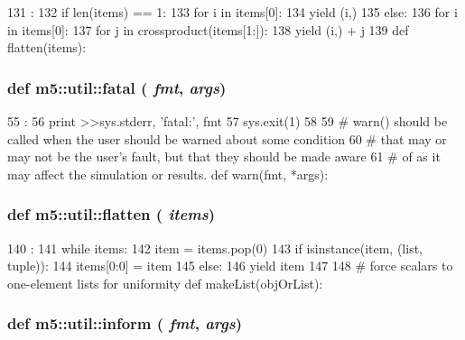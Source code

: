 \begin{DoxyCode}
131                        :
132     if len(items) == 1:
133         for i in items[0]:
134             yield (i,)
135     else:
136         for i in items[0]:
137             for j in crossproduct(items[1:]):
138                 yield (i,) + j
139 
def flatten(items):
\end{DoxyCode}
\hypertarget{namespacem5_1_1util_ae1c80955a028fc0aec505dbd4fa9e09c}{
\subsubsection[{fatal}]{\setlength{\rightskip}{0pt plus 5cm}def m5::util::fatal ( {\em fmt}, \/   {\em args})}}
\label{namespacem5_1_1util_ae1c80955a028fc0aec505dbd4fa9e09c}



\begin{DoxyCode}
55                      :
56     print >>sys.stderr, 'fatal:', fmt %
57     sys.exit(1)
58 
59 # warn() should be called when the user should be warned about some condition
60 # that may or may not be the user's fault, but that they should be made aware
61 # of as it may affect the simulation or results.
def warn(fmt, *args):
\end{DoxyCode}
\hypertarget{namespacem5_1_1util_a3a48f3283686eb13056318134122a74a}{
\subsubsection[{flatten}]{\setlength{\rightskip}{0pt plus 5cm}def m5::util::flatten ( {\em items})}}
\label{namespacem5_1_1util_a3a48f3283686eb13056318134122a74a}



\begin{DoxyCode}
140                   :
141     while items:
142         item = items.pop(0)
143         if isinstance(item, (list, tuple)):
144             items[0:0] = item
145         else:
146             yield item
147 
148 # force scalars to one-element lists for uniformity
def makeList(objOrList):
\end{DoxyCode}
\hypertarget{namespacem5_1_1util_a93d91fcd263b81cfcf7cdbf726f106d6}{
\subsubsection[{inform}]{\setlength{\rightskip}{0pt plus 5cm}def m5::util::inform ( {\em fmt}, \/   {\em args})}}
\label{namespacem5_1_1util_a93d91fcd263b81cfcf7cdbf726f106d6}



